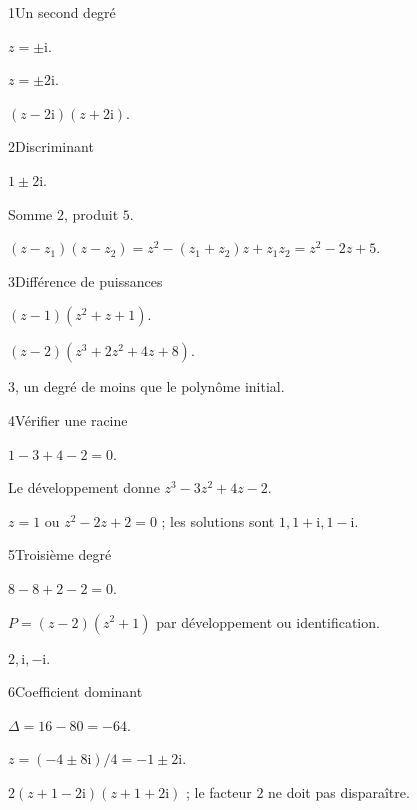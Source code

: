 \begin{corrige}{1}{Un second degré}
\begin{questions}
\item $z=\pm\mathrm i$.
\item $z=\pm2\mathrm i$.
\item $(z-2\mathrm i)(z+2\mathrm i)$.
\end{questions}
\end{corrige}
\begin{corrige}{2}{Discriminant}
\begin{questions}
\item $1\pm2\mathrm i$.
\item Somme $2$, produit $5$.
\item $(z-z_1)(z-z_2)=z^2-(z_1+z_2)z+z_1z_2=z^2-2z+5$.
\end{questions}
\end{corrige}
\begin{corrige}{3}{Différence de puissances}
\begin{questions}
\item $(z-1)(z^2+z+1)$.
\item $(z-2)(z^3+2z^2+4z+8)$.
\item $3$, un degré de moins que le polynôme initial.
\end{questions}
\end{corrige}
\begin{corrige}{4}{Vérifier une racine}
\begin{questions}
\item $1-3+4-2=0$.
\item Le développement donne $z^3-3z^2+4z-2$.
\item $z=1$ ou $z^2-2z+2=0$ ; les solutions sont $1,1+\mathrm i,1-\mathrm i$.
\end{questions}
\end{corrige}
\begin{corrige}{5}{Troisième degré}
\begin{questions}
\item $8-8+2-2=0$.
\item $P=(z-2)(z^2+1)$ par développement ou identification.
\item $2,\mathrm i,-\mathrm i$.
\end{questions}
\end{corrige}
\begin{corrige}{6}{Coefficient dominant}
\begin{questions}
\item $\Delta=16-80=-64$.
\item $z=(-4\pm8\mathrm i)/4=-1\pm2\mathrm i$.
\item $2(z+1-2\mathrm i)(z+1+2\mathrm i)$ ; le facteur $2$ ne doit pas disparaître.
\end{questions}
\end{corrige}
